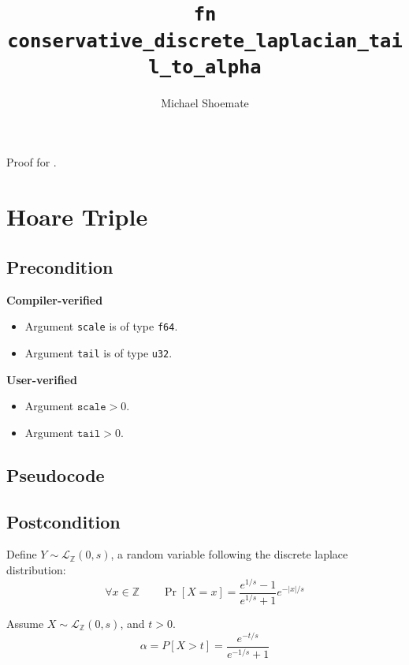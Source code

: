 \documentclass{article}
\title{\texttt{fn conservative\_discrete\_laplacian\_tail\_to\_alpha}}
\author{Michael Shoemate}
\begin{document}
 
\maketitle 
 
Proof for . 
 
\section{Hoare Triple} 
\subsection*{Precondition} 
 
\textbf{Compiler-verified} 
\begin{itemize} 
    \item Argument \texttt{scale} is of type \texttt{f64}. 
    \item Argument \texttt{tail} is of type \texttt{u32}. 
\end{itemize} 
 
\textbf{User-verified} 
\begin{itemize} 
    \item Argument $\texttt{scale} > 0$. 
    \item Argument $\texttt{tail} > 0$. 
\end{itemize} 
 
\subsection*{Pseudocode} 
 
 
\subsection*{Postcondition} 
\begin{definition} 
    Define $Y \sim \mathcal{L}_\mathbb{Z}(0, s)$, a random variable following the discrete laplace distribution: 
    \begin{equation} 
        \forall x \in \mathbb{Z} \qquad \Pr[X = x] = \frac{e^{1/s} - 1}{e^{1/s} + 1} e^{-|x|/s} 
    \end{equation} 
\end{definition} 
 
\begin{theorem} 
    Assume $X \sim \mathcal{L}_\mathbb{Z}(0, s)$, and $t > 0$. 
    \begin{equation} 
        \alpha = P[X > t] = \frac{e^{-t/s}}{e^{-1/s} + 1} 
    \end{equation} 
\end{theorem} 
 
\end{document}
